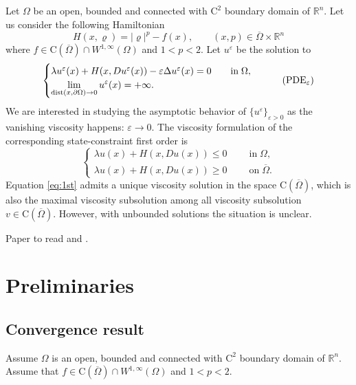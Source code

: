 \documentclass[11pt,reqno]{amsart}
\numberwithin{figure}{section}
\theoremstyle{plain}
\theoremstyle{remark}
\numberwithin{equation}{section}
\newcommand{\rmC}{\mathrm{C}}
\begin{document}
Let $\Omega$ be an open, bounded and connected with $\mathrm{C}^2$ boundary domain of $\mathbb{R}^n$. Let us consider the following Hamiltonian
\begin{equation*}
    H(x,\varrho) = |\varrho|^p-f(x), \qquad (x,p)\in \overline{\Omega}\times \mathbb{R}^n
\end{equation*}
where $f\in \mathrm{C}(\overline{\Omega})\cap W^{1,\infty}(\Omega)$ and $1<p<2$. Let $u^\varepsilon$ be the solution to 
\begin{equation}\label{eq:PDE}
    \begin{cases}
    \lambda u^\varepsilon(x) + H(x,Du^\varepsilon(x)) - \varepsilon \Delta u^\varepsilon(x) = 0 \qquad
    \text{in}\;\Omega, \vspace{0cm}\\
    \displaystyle  \lim_{\mathrm{dist}(x,\partial \Omega)\to 0} u^\varepsilon(x) = +\infty.
    \end{cases} \tag{PDE$_\varepsilon$}
\end{equation}
We are interested in studying the asymptotic behavior of $\{u^\varepsilon\}_{\varepsilon>0}$ as the vanishing viscosity happens: $\varepsilon\rightarrow 0$. The viscosity formulation of the corresponding state-constraint first order is
\begin{equation}\label{eq:1st}
    \begin{cases}
     \lambda u(x) + H(x,Du(x)) \leq 0\;\qquad\text{in}\;\Omega,\\
     \lambda u(x) + H(x,Du(x)) \geq 0\;\qquad\text{on}\;\overline{\Omega}.
    \end{cases}
\end{equation}
Equation \eqref{eq:1st} admits a unique viscosity solution in the space $\rmC(\overline{\Omega})$, which is also the maximal viscosity subsolution among all viscosity subsolution $v\in\rmC(\overline{\Omega})$. However, with unbounded solutions the situation is unclear.

Paper to read \cite{Ishii2017a} and \cite{Lasry1989}.

\section{Preliminaries}\label{sec:prelim}




\subsection{Convergence result}
Assume $\Omega$ is an open, bounded and connected with $\mathrm{C}^2$ boundary domain of $\mathbb{R}^n$. Assume that $f\in \mathrm{C}(\overline{\Omega})\cap W^{1,\infty}(\Omega)$ and $1<p<2$. 
\end{document}
